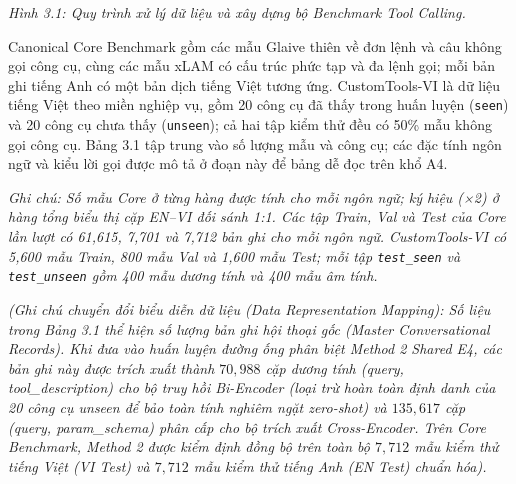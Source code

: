 \textit{Hình 3.1: Quy trình xử lý dữ liệu và xây dựng bộ Benchmark Tool Calling.}

Canonical Core Benchmark gồm các mẫu Glaive thiên về đơn lệnh và câu không gọi công cụ, cùng các mẫu xLAM có cấu trúc phức tạp và đa lệnh gọi; mỗi bản ghi tiếng Anh có một bản dịch tiếng Việt tương ứng. CustomTools-VI là dữ liệu tiếng Việt theo miền nghiệp vụ, gồm 20 công cụ đã thấy trong huấn luyện (\texttt{seen}) và 20 công cụ chưa thấy (\texttt{unseen}); cả hai tập kiểm thử đều có 50\% mẫu không gọi công cụ. Bảng 3.1 tập trung vào số lượng mẫu và công cụ; các đặc tính ngôn ngữ và kiểu lời gọi được mô tả ở đoạn này để bảng dễ đọc trên khổ A4.


\begin{table}[htbp]
    \centering
    \caption{Thống kê định lượng các bộ dữ liệu trong Benchmark Tool Calling Tiếng Việt}
    \label{tab:bảng_3_1}
\end{table}

\textit{Ghi chú: Số mẫu Core ở từng hàng được tính cho mỗi ngôn ngữ; ký hiệu (×2) ở hàng tổng biểu thị cặp EN–VI đối sánh 1:1. Các tập Train, Val và Test của Core lần lượt có 61,615, 7,701 và 7,712 bản ghi cho mỗi ngôn ngữ. CustomTools-VI có 5,600 mẫu Train, 800 mẫu Val và 1,600 mẫu Test; mỗi tập \texttt{test_seen} và \texttt{test_unseen} gồm 400 mẫu dương tính và 400 mẫu âm tính.}

\textit{(Ghi chú chuyển đổi biểu diễn dữ liệu (Data Representation Mapping): Số liệu trong Bảng 3.1 thể hiện số lượng bản ghi hội thoại gốc (Master Conversational Records). Khi đưa vào huấn luyện đường ống phân biệt Method 2 Shared E4, các bản ghi này được trích xuất thành $70{,}988$ cặp dương tính (query, tool\_description) cho bộ truy hồi Bi-Encoder (loại trừ hoàn toàn định danh của 20 công cụ unseen để bảo toàn tính nghiêm ngặt zero-shot) và $135{,}617$ cặp (query, param\_schema) phân cấp cho bộ trích xuất Cross-Encoder. Trên Core Benchmark, Method 2 được kiểm định đồng bộ trên toàn bộ $7{,}712$ mẫu kiểm thử tiếng Việt (VI Test) và $7{,}712$ mẫu kiểm thử tiếng Anh (EN Test) chuẩn hóa).}

